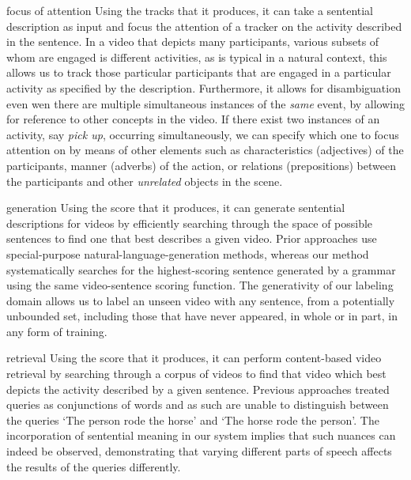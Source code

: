 \begin{compactdesc}\vspace{1ex}
\item[focus of attention] Using the tracks that it produces, it can take a
  sentential description as input and focus the attention of a tracker on the
  activity described in the sentence.
  In a video that depicts many participants, various subsets of whom are
  engaged is different activities, as is typical in a natural context, this
  allows us to track those particular participants that are engaged in a
  particular activity as specified by the description.
  Furthermore, it allows for disambiguation even wen there are multiple
  simultaneous instances of the \emph{same} event, by allowing for reference
  to other concepts in the video.
  If there exist two instances of an activity, say \emph{pick up}, occurring
  simultaneously, we can specify which one to focus attention on by means of
  other elements such as characteristics (adjectives) of the participants, manner
  (adverbs) of the action, or relations (prepositions) between the participants
  and other \emph{unrelated} objects in the scene.
  \vspace{0.5ex}
\item[generation] Using the score that it produces, it can generate
  sentential descriptions for videos by efficiently searching through the
  space of possible sentences to find one that best describes a given video.
  Prior approaches use special-purpose natural-language-generation methods,
  whereas our method systematically searches for the highest-scoring sentence
  generated by a grammar using the same video-sentence scoring function.
  The generativity of our labeling domain allows us to label an unseen video
  with any sentence, from a potentially unbounded set, including those that
  have never appeared, in whole or in part, in any form of training.
  \vspace{0.5ex}
\item[retrieval] Using the score that it produces, it can perform
  content-based video retrieval by searching through a corpus of videos to
  find that video which best depicts the activity described by a given
  sentence.
  Previous approaches treated queries as conjunctions of words and as such
  are unable to distinguish between the queries `The person rode the horse'
  and `The horse rode the person'.
  The incorporation of sentential meaning in our system implies that such
  nuances can indeed be observed, demonstrating that varying different parts
  of speech affects the results of the queries differently.
\end{compactdesc}\vspace{1ex}


